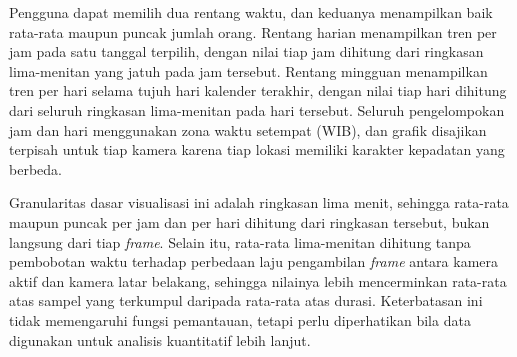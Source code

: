 Pengguna dapat memilih dua rentang waktu, dan keduanya menampilkan baik rata-rata maupun 
puncak jumlah orang. Rentang harian menampilkan tren per jam pada satu tanggal terpilih, 
dengan nilai tiap jam dihitung dari ringkasan lima-menitan yang jatuh pada jam tersebut. 
Rentang mingguan menampilkan tren per hari selama tujuh hari kalender terakhir, dengan nilai 
tiap hari dihitung dari seluruh ringkasan lima-menitan pada hari tersebut. Seluruh 
pengelompokan jam dan hari menggunakan zona waktu setempat (WIB), dan grafik disajikan 
terpisah untuk tiap kamera karena tiap lokasi memiliki karakter kepadatan yang berbeda.

Granularitas dasar visualisasi ini adalah ringkasan lima menit, sehingga rata-rata maupun 
puncak per jam dan per hari dihitung dari ringkasan tersebut, bukan langsung dari tiap 
\textit{frame}. Selain itu, rata-rata lima-menitan dihitung tanpa pembobotan waktu terhadap 
perbedaan laju pengambilan \textit{frame} antara kamera aktif dan kamera latar belakang, 
sehingga nilainya lebih mencerminkan rata-rata atas sampel yang terkumpul daripada rata-rata 
atas durasi. Keterbatasan ini tidak memengaruhi fungsi pemantauan, tetapi perlu diperhatikan 
bila data digunakan untuk analisis kuantitatif lebih lanjut.